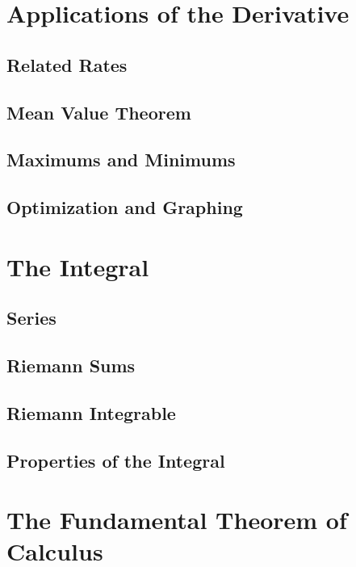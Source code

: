 \documentclass{amsbook}
\begin{document}

\chapter{Applications of the Derivative}

\section{Related Rates}

\section{Mean Value Theorem}

\section{Maximums and Minimums}

\section{Optimization and Graphing}


\chapter{The Integral}
\section{Series}

\section{Riemann Sums}


\section{Riemann Integrable}


\section{Properties of the Integral}



\chapter{The Fundamental Theorem of Calculus}
\end{document}
